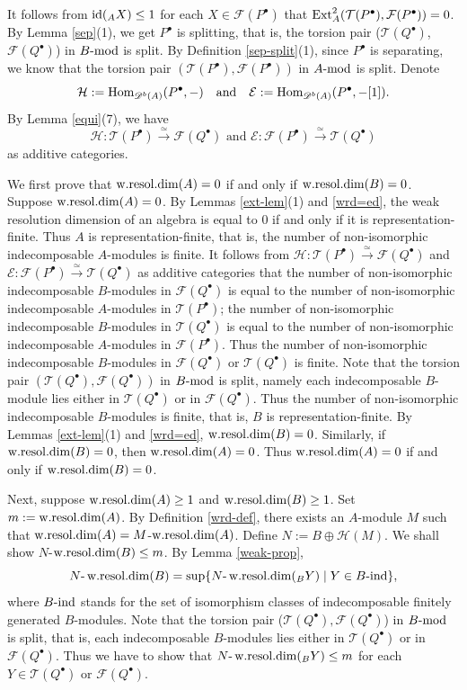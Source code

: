\documentclass[12pt]{article}
\numberwithin{equation}{section}
\theoremstyle{definition}
\def\wrd{\mathop{\rm w.resol.dim}\nolimits}
\newcommand{\id}{{\rm id}}
\def\E{\mathcal{E}}
\newcommand{\F}{{\mathcal F}}
\def\H{\mathcal{H}}
\newcommand{\T}{{\mathcal T}}
\newcommand{\Db}[1]{{\mathscr D}^b(#1)}
\newcommand{\modcat}{\ensuremath{\mbox{{\rm -mod}}}}
\newcommand{\indmod}{\ensuremath{\mbox{{\rm -ind}}}}
\newcommand{\Hom}{{\rm Hom}}
\newcommand{\Ext}{{\rm Ext}}
\newcommand{\lra}{\longrightarrow}
\newcommand{\lraf}[1]{\stackrel{#1}{\lra}}
\begin{document}
It follows from $\id(_AX)\le 1$ for each $X\in \F(P^{\bullet})$ that $\Ext^{2}_{A}(\T(P^{\bullet}),\F(P^{\bullet}))=0$. By Lemma \ref{sep}(1), we get $P^{\bullet}$ is splitting, that is, the torsion pair ($\T(Q^{\bullet})$, $\F(Q^{\bullet})$) in $B\modcat$ is split. By Definition \ref{sep-split}(1), since $P^{\bullet}$ is separating, we know that the torsion pair $(\T(P^{\bullet}),\F(P^{\bullet}))$ in $A\modcat$ is split. Denote
$$\H:=\Hom_{\Db{A}}(P^{\bullet},-) \quad\mbox{and}\quad
\E:=\Hom_{\Db{A}}(P^{\bullet},-[1]).$$
By Lemma \ref{equi}(7), we have
$$\H: \T(P^{\bullet})\lraf{\simeq} \F(Q^{\bullet})
\mbox{ and }
\E:\F(P^{\bullet})\lraf{\simeq} \T(Q^{\bullet})$$ as additive categories.

We first prove that $\wrd(A)=0$ if and only if $\wrd(B)=0$. Suppose $\wrd(A)=0$.
By Lemmas \ref{ext-lem}(1) and \ref{wrd=ed}, the weak resolution dimension of an algebra is equal to $0$ if and only if it is representation-finite. Thus $A$ is representation-finite, that is, the number of non-isomorphic indecomposable $A$-modules is finite.
It follows from $\H: \T(P^{\bullet})\lraf{\simeq} \F(Q^{\bullet})$ and $\E:\F(P^{\bullet})\lraf{\simeq} \T(Q^{\bullet})$ as additive categories that the number of non-isomorphic indecomposable $B$-modules in $\F(Q^{\bullet})$ is equal to the number of non-isomorphic indecomposable $A$-modules in $\T(P^{\bullet})$; the number of non-isomorphic indecomposable $B$-modules in $\T(Q^{\bullet})$ is equal to the number of non-isomorphic indecomposable $A$-modules in $\F(P^{\bullet})$.
Thus the number of non-isomorphic indecomposable $B$-modules in $\F(Q^{\bullet})$ or $\T(Q^{\bullet})$ is finite.
Note that the torsion pair $(\T(Q^{\bullet}),\F(Q^{\bullet}))$ in $B\modcat$ is split, namely each indecomposable $B$-module lies either in $\T(Q^{\bullet})$ or in $\F(Q^{\bullet})$.
Thus the number of non-isomorphic indecomposable $B$-modules is finite, that is, $B$ is representation-finite. By Lemmas \ref{ext-lem}(1) and \ref{wrd=ed}, $\wrd(B)=0$. Similarly, if $\wrd(B)=0$, then $\wrd(A)=0$. Thus $\wrd(A)=0$ if and only if $\wrd(B)=0$.

Next, suppose $\wrd(A)\ge 1$ and $\wrd(B)\ge 1$. Set $m:=\wrd(A)$. By Definition \ref{wrd-def}, there exists an $A$-module $M$ such that $\wrd(A)=M$-$\wrd(A)$. Define $N:=B\oplus \H(M)$. We shall show $N$-$\wrd(B)\le m$.
By Lemma \ref{weak-prop}, $$N\mbox{-}\wrd(B)=\sup\{N\mbox{-}\wrd(_BY)\mid Y\in B\indmod\},$$
where $B\indmod$ stands for the set of isomorphism classes of indecomposable finitely generated $B$-modules.
Note that the torsion pair ($\T(Q^{\bullet}),\F(Q^{\bullet})$) in $B\modcat$ is split, that is, each indecomposable $B$-modules lies either in $\T(Q^{\bullet})$ or in $\F(Q^{\bullet})$.
Thus we have to show that $N\mbox{-}\wrd(_BY)\le m$ for each $Y\in \T(Q^{\bullet})$ or $\F(Q^{\bullet})$.
\end{document}
